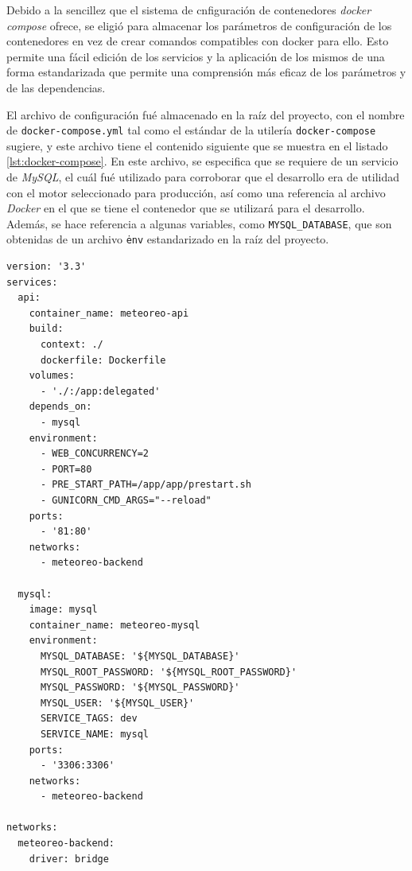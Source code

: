 
Debido a la sencillez que el sistema de cnfiguración de contenedores \emph{docker compose} ofrece, se eligió para almacenar los parámetros de configuración de los contenedores en vez de crear comandos compatibles con docker para ello. Esto permite una fácil edición de los servicios y la aplicación de los mismos de una forma estandarizada que permite una comprensión más eficaz de los parámetros y de las dependencias.

El archivo de configuración fué almacenado en la raíz del proyecto, con el nombre de \texttt{docker-compose.yml}  tal como el estándar de la utilería \texttt{docker-compose} sugiere, y este archivo tiene el contenido siguiente que se muestra en el listado \ref{lst:docker-compose}. En este archivo, se especifica que se requiere de un servicio de \textit{MySQL}, el cuál fué utilizado para corroborar que el desarrollo era de utilidad con el motor seleccionado para producción, así como una referencia al archivo \textit{Docker} en el que se tiene el contenedor que se utilizará para el desarrollo. Además, se hace referencia a algunas variables, como \texttt{MYSQL\_DATABASE}, que son obtenidas de un archivo \texttt{\.env} estandarizado en la raíz del proyecto.

\begin{verbatim}
version: '3.3'
services:
  api:
    container_name: meteoreo-api
    build:
      context: ./
      dockerfile: Dockerfile
    volumes:
      - './:/app:delegated'
    depends_on:
      - mysql
    environment:
      - WEB_CONCURRENCY=2
      - PORT=80
      - PRE_START_PATH=/app/app/prestart.sh
      - GUNICORN_CMD_ARGS="--reload"
    ports:
      - '81:80'
    networks:
      - meteoreo-backend

  mysql:
    image: mysql
    container_name: meteoreo-mysql
    environment:
      MYSQL_DATABASE: '${MYSQL_DATABASE}'
      MYSQL_ROOT_PASSWORD: '${MYSQL_ROOT_PASSWORD}'
      MYSQL_PASSWORD: '${MYSQL_PASSWORD}'
      MYSQL_USER: '${MYSQL_USER}'
      SERVICE_TAGS: dev
      SERVICE_NAME: mysql
    ports:
      - '3306:3306'
    networks:
      - meteoreo-backend

networks:
  meteoreo-backend:
    driver: bridge
\end{verbatim}

